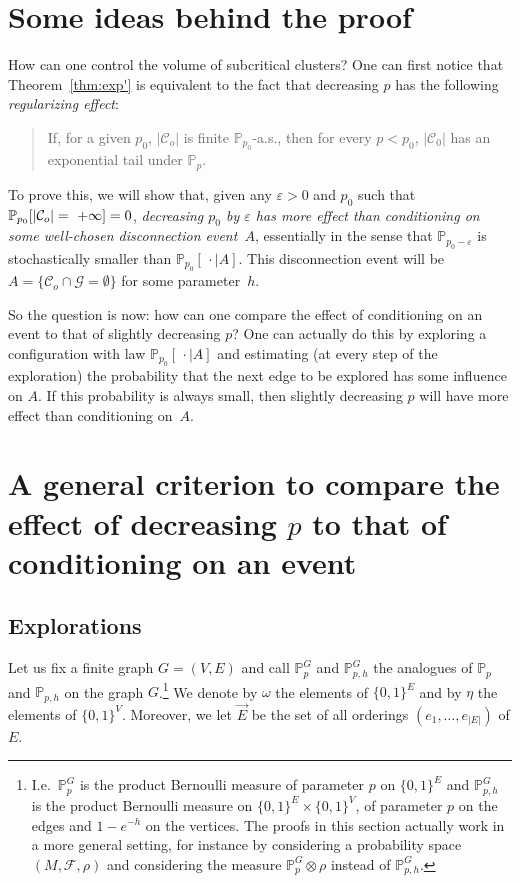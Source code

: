 \documentclass[10pt]{amsart}
\theoremstyle{definition}\newtheorem{defi}[theo]{Definition}\newtheorem{rema}[theo]{Remark}\newtheorem{exam}[theo]{Example}\newtheorem{exem}[theo]{Example}\newtheorem{nota}[theo]{Notation}
\newcommand{\Pro}{\mathbb{P}}
\newcommand{\clF}{\mathcal{F}}
\newcommand{\calC}{\mathcal{C}}
\newcommand{\calG}{\mathcal{G}}
\begin{document}
\section{Some ideas behind the proof}\label{sec:ideas}

How can one control the volume of subcritical clusters? One can first notice that Theorem~\ref{thm:exp'} is equivalent to the fact that decreasing $p$ has the following \emph{regularizing effect}:
\begin{quote}
If, for a given $p_0$, $|\calC_o|$ is finite $\Pro_{p_0}$-a.s., then for every $p<p_0$, $|\calC_0|$ has an exponential tail under $\Pro_p$.
\end{quote}
To prove this, we will show that, given any $\varepsilon>0$ and $p_0$ such that $\Pro_{p_0}[|\calC_o|=~+\infty]\linebreak=0$, \emph{decreasing $p_0$ by $\varepsilon$ has more effect than conditioning on some well-chosen disconnection event~$A$}, essentially in the sense that $\Pro_{p_0-\varepsilon}$ is stochastically smaller than $\Pro_{p_0}[\,\cdot\mid A]$. This disconnection event will be $A=\{ \calC_o \cap \calG = \emptyset\}$ for some parameter~$h$.



So the question is now: how can one compare the effect of conditioning on an event to that of slightly decreasing $p$? One can actually do this by exploring a configuration with law $\Pro_{p_0}[\, \cdot \mid A]$ and estimating (at every step of the exploration) the probability that the next edge to be explored has some influence on $A$. If this probability is always small, then slightly decreasing $p$ will have more effect than conditioning on~$A$.

\section{A general criterion to compare the effect of decreasing \texorpdfstring{$p$}{p} to that of conditioning on an event}\label{sec:gen}

\subsection{Explorations}

Let us fix a finite graph $G=(V,E)$ and call $\Pro_p^G$ and $\Pro_{p,h}^{G}$ the analogues of $\Pro_p$ and $\Pro_{p,h}$ on the graph $G$.\footnote{I.e.\ $\Pro_p^G$ is the product Bernoulli measure of parameter $p$ on $\{0,1\}^E$ and $\Pro_{p,h}^G$ is the product Bernoulli measure on $\{0,1\}^E\times\{0,1\}^V$, of parameter $p$ on the edges and $1-e^{-h}$ on the vertices. The proofs in this section actually work in a more general setting, for instance by considering a probability space $(M,\clF,\rho)$ and considering the measure $\Pro_p^G\otimes\rho$ instead of $\Pro_{p,h}^G$.} We denote by $\omega$ the elements of $\{0,1\}^E$ and by $\eta$ the elements of $\{0,1\}^V$. Moreover, we let $\vec{E}$ be the set of all orderings $(e_1,\dots,e_{|E|})$ of $E$.
\end{document}
